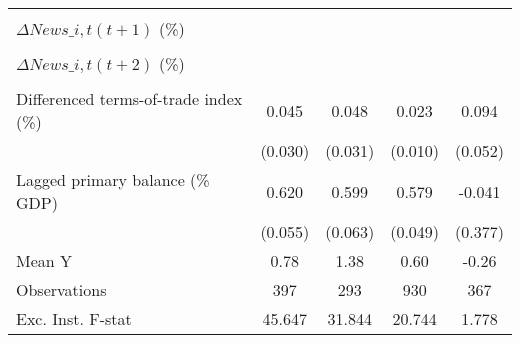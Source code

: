 {\begin{tabular}{l*{4}{c}}
                    &                     &                     &                     &                     \\
\addlinespace
$ \Delta News\_{i,t}(t+1)$ (\%)&                     &                     &                     &                     \\
                    &                     &                     &                     &                     \\
\addlinespace
$ \Delta News\_{i,t}(t+2)$ (\%)&                     &                     &                     &                     \\
                    &                     &                     &                     &                     \\
\addlinespace
Differenced terms-of-trade index (\%)&       0.045         &       0.048         &       0.023\sym{**} &       0.094\sym{*}  \\
                    &     (0.030)         &     (0.031)         &     (0.010)         &     (0.052)         \\
\addlinespace
Lagged primary balance (\% GDP)&       0.620\sym{***}&       0.599\sym{***}&       0.579\sym{***}&      -0.041         \\
                    &     (0.055)         &     (0.063)         &     (0.049)         &     (0.377)         \\
\midrule
Mean Y              &        0.78         &        1.38         &        0.60         &       -0.26         \\
Observations        &         397         &         293         &         930         &         367         \\
Exc. Inst. F-stat   &      45.647         &      31.844         &      20.744         &       1.778         \\
\bottomrule
\end{tabular}
}
